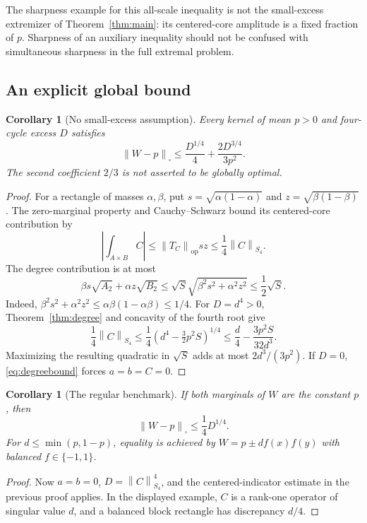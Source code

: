 \documentclass[11pt]{article}
\newtheorem{corollary}[theorem]{Corollary}
\theoremstyle{definition}
\newcommand{\1}{\mathbf 1}
\newcommand{\Cut}[1]{\left\|#1\right\|_{\square}}
\newcommand{\Sfour}[1]{\left\|#1\right\|_{S_4}}
\newcommand{\op}[1]{\left\|#1\right\|_{\mathrm{op}}}
\begin{document}
The sharpness example for this all-scale inequality is not the small-excess extremizer of Theorem~\ref{thm:main}: its centered-core amplitude is a fixed fraction of $p$. Sharpness of an auxiliary inequality should not be confused with simultaneous sharpness in the full extremal problem.

\subsection{An explicit global bound}
\begin{corollary}[No small-excess assumption]\label{cor:global}
Every kernel of mean $p>0$ and four-cycle excess $D$ satisfies
\begin{equation}\label{eq:global}
 \Cut{W-p}\le \frac{D^{1/4}}4+\frac{2D^{3/4}}{3p^2}.
\end{equation}
The second coefficient $2/3$ is not asserted to be globally optimal.
\end{corollary}
\begin{proof}
For a rectangle of masses $\alpha,\beta$, put
$s=\sqrt{\alpha(1-\alpha)}$ and $z=\sqrt{\beta(1-\beta)}$.
The zero-marginal property and Cauchy--Schwarz bound its centered-core contribution by
\[
 \left|\int_{A\times B}C\right|\le \op{T_C}sz\le\frac14\Sfour{C}.
\]
The degree contribution is at most
\[
 \beta s\sqrt{A_2}+\alpha z\sqrt{B_2}
 \le\sqrt{S}\sqrt{\beta^2s^2+\alpha^2z^2}\le\frac12\sqrt S.
\]
Indeed, $\beta^2s^2+\alpha^2z^2\le\alpha\beta(1-\alpha\beta)\le1/4$.
For $D=d^4>0$, Theorem~\ref{thm:degree} and concavity of the fourth root give
\[
 \frac14\Sfour{C}
 \le\frac14(d^4-\tfrac32p^2S)^{1/4}
 \le\frac d4-\frac{3p^2S}{32d^3}.
\]
Maximizing the resulting quadratic in $\sqrt S$ adds at most $2d^3/(3p^2)$. If $D=0$, \eqref{eq:degreebound} forces $a=b=C=0$.
\end{proof}

\begin{corollary}[The regular benchmark]\label{cor:regular}
If both marginals of $W$ are the constant $p$, then
\[
 \Cut{W-p}\le\frac14D^{1/4}.
\]
For $d\le\min(p,1-p)$, equality is achieved by $W=p\pm d f(x)f(y)$ with balanced $f\in\{-1,1\}$.
\end{corollary}
\begin{proof}
Now $a=b=0$, $D=\Sfour{C}^4$, and the centered-indicator estimate in the previous proof applies. In the displayed example, $C$ is a rank-one operator of singular value $d$, and a balanced block rectangle has discrepancy $d/4$.
\end{proof}
\end{document}
